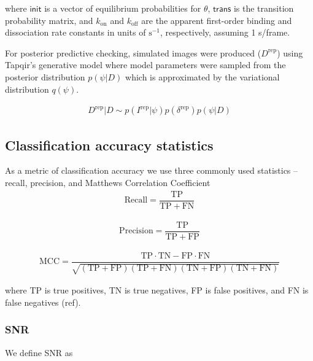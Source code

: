 \noindent
where $\mathsf{init}$ is a vector of equilibrium probabilities for $\theta$, $\mathsf{trans}$ is the transition probability matrix, and $k_{\mathrm{on}}$ and $k_{\mathrm{off}}$ are the apparent first-order binding and dissociation rate constants in units of $\mathrm{s}^{-1}$, respectively, assuming 1 s/frame.

For posterior predictive checking, simulated images were produced ($D^\mathrm{rep}$) using Tapqir's generative model where model parameters were sampled from the posterior distribution $p(\psi|D)$ which is approximated by the variational distribution $q(\psi)$. %

\begin{gather*}
    D^\mathrm{rep} | D \sim p(I^\mathrm{rep} | \psi) p(\delta^\mathrm{rep}) p(\psi | D)
\end{gather*}

\subsection*{Classification accuracy statistics}

As a metric of classification accuracy we use three commonly used statistics -- recall, precision, and Matthews Correlation Coefficient \cite{Matthews1975-rw}
\begin{gather*}
    \mathrm{Recall} = \dfrac{\mathrm{TP}}{\mathrm{TP} + \mathrm{FN}}
\end{gather*}

\begin{gather*}
    \mathrm{Precision} = \dfrac{\mathrm{TP}}{\mathrm{TP} + \mathrm{FP}}
\end{gather*}

\begin{gather*}
    \mathrm{MCC} =
        \dfrac{\mathrm{TP} \cdot \mathrm{TN} - \mathrm{FP} \cdot \mathrm{FN}}
        {\sqrt{(\mathrm{TP} + \mathrm{FP}) (\mathrm{TP} + \mathrm{FN}) (\mathrm{TN} + \mathrm{FP}) (\mathrm{TN} + \mathrm{FN})}}
\end{gather*}

\noindent
where TP is true positives, TN is true negatives, FP is false positives, and FN is false negatives (ref).

\subsubsection*{SNR}

We define SNR as


